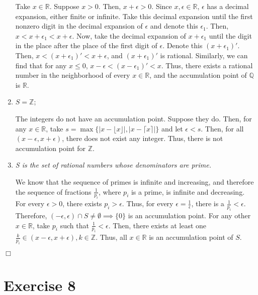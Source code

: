 \documentclass[
]{article}
\begin{document}
\begin{enumerate}
Take $x \in \mathbb{R}$. Suppose $x > 0$. Then, $x + \epsilon > 0$. Since $x, \epsilon \in \mathbb{R}$,  $\epsilon$ has a decimal expansion, either finite or infinite. Take this decimal expansion until the first nonzero digit in the decimal expansion of $\epsilon$ and denote this $\epsilon_1$. Then, $x < x + \epsilon_1 < x + \epsilon$. Now, take the decimal expansion of $x + \epsilon_1$ until the digit in the place after the place of the first digit of $\epsilon$. Denote this $(x + \epsilon_1)'$. Then, $x < (x + \epsilon_1)' < x + \epsilon$, and $(x + \epsilon_1)'$ is rational. Similarly, we can find that for any $x \leq 0$, $x - \epsilon < (x - \epsilon_1)' < x$. Thus, there exists a rational number in the neighborhood of every $x \in \mathbb{R}$, and the accumulation point of $\mathbb{Q}$ is $\mathbb{R}$. 

\item $S = \mathbb{Z}$;  
  
The integers do not have an accumulation point. Suppose they do. Then, for any $x \in \mathbb{R}$, take $s = \max\{|x - \lfloor{x}\rfloor| , |x - \lceil x \rceil|\}$ and let $\epsilon < s$. Then, for all $(x - \epsilon, x + \epsilon)$, there does not exist any integer. Thus, there is not accumulation point for $\mathbb{Z}$. 

\item \textit{S is the set of rational numbers whose denominators are prime.}  
  
We know that the sequence of primes is infinite and increasing, and therefore the sequence of fractions $\frac{1}{p_i}$, where $p_i$ is a prime, is infinite and decreasing. For every $\epsilon > 0$, there exists $p_i > \epsilon$. Thus, for every $\epsilon = \frac{1}{\epsilon}$, there is a $\frac{1}{p_i} < \epsilon$. Therefore, $(-\epsilon, \epsilon) \cap S \neq \emptyset \implies \{0\}$ is an accumulation point. For any other $x \in \mathbb{R}$, take $p_i$ such that $\frac{1}{p_i} < \epsilon$. Then, there exists at least one $\frac{k}{p_i} \in (x-\epsilon, x +\epsilon), k \in \mathbb{Z}$. Thus, all $x \in \mathbb{R}$ is an accumulation point of $S$.

\end{enumerate}

\hfill \(\Box\)

\hypertarget{exercise-8}{%
\section{Exercise 8}\label{exercise-8}}
\end{document}
